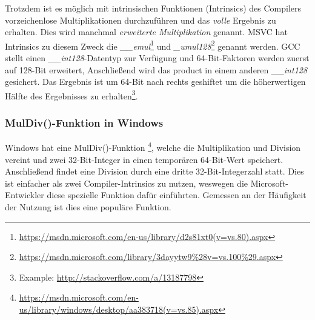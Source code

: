Trotzdem ist es möglich mit intrinsischen Funktionen (Intrinsics) des Compilers vorzeichenlose Multiplikationen durchzuführen
und das \emph{volle} Ergebnis zu erhalten.
Dies wird manchmal \emph{erweiterte Multiplikation} genannt.
MSVC hat Intrinsics zu diesem Zweck die \emph{\_\_emul}\footnote{\url{https://msdn.microsoft.com/en-us/library/d2s81xt0(v=vs.80).aspx}}
und \emph{\_umul128}\footnote{\url{https://msdn.microsoft.com/library/3dayytw9%28v=vs.100%29.aspx}} genannt werden.
GCC stellt einen \emph{\_\_int128}-Datentyp zur Verfügung und 64-Bit-Faktoren werden zuerst auf 128-Bit erweitert,
Anschließend wird das \gls{product} in einem anderen \emph{\_\_int128} gesichert.
Das Ergebnis ist um 64-Bit nach rechts geshiftet um die höherwertigen Hälfte des Ergebnisses
zu erhalten\footnote{Example: \url{http://stackoverflow.com/a/13187798}}.

\subsubsection{MulDiv()-Funktion in Windows}

Windows hat eine MulDiv()-Funktion
\footnote{\url{https://msdn.microsoft.com/en-us/library/windows/desktop/aa383718(v=vs.85).aspx}},
welche die Multiplikation und Division vereint und zwei 32-Bit-Integer in einen temporären 64-Bit-Wert
speichert. Anschließend findet eine Division durch eine dritte 32-Bit-Integerzahl statt.
Dies ist einfacher als zwei Compiler-Intrinsics zu nutzen, weswegen die Microsoft-Entwickler diese
spezielle Funktion dafür einführten.
Gemessen an der Häufigkeit der Nutzung ist dies eine populäre Funktion.
